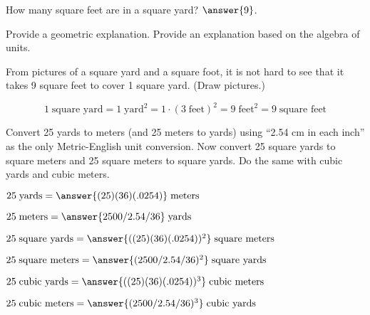 \documentclass[nooutcomes]{ximera}
\begin{document}
\begin{question}
How many square feet are in a square yard?  $\answer{9}$.  

Provide a geometric explanation. Provide an explanation based on the algebra of units. 
\begin{freeResponse}
\begin{hint}
From pictures of a square yard and a square foot, it is not hard to see that it takes 9 square feet to cover 1 square yard.  (Draw pictures.)
\end{hint}
\begin{hint}
\[
1\;\textrm{square yard} = 1\;\textrm{yard}^2 = 1\cdot(3\;\textrm{feet})^2 = 9\;\textrm{feet}^2 = 9\;\textrm{square feet}
\]
\end{hint}
\end{freeResponse}
\end{question}

\begin{problem}
Convert 25 yards to meters (and 25 meters to yards) using ``2.54 cm in each inch'' as the only Metric-English unit conversion.  Now convert 25 square yards to square meters and 25 square meters to square yards.  Do the same with cubic yards and cubic meters.

$25\;\textrm{yards} = \answer{(25)(36)(.0254)} \;\textrm{meters}$

$25\;\textrm{meters} = \answer{2500/2.54/36} \;\textrm{yards}$

$25\;\textrm{square yards} = \answer{((25)(36)(.0254))^2} \;\textrm{square meters}$

$25\;\textrm{square meters} = \answer{(2500/2.54/36)^2} \;\textrm{square yards}$

$25\;\textrm{cubic yards} = \answer{((25)(36)(.0254))^3} \;\textrm{cubic meters}$

$25\;\textrm{cubic meters} = \answer{(2500/2.54/36)^3} \;\textrm{cubic yards}$

\end{problem}
\end{document}
